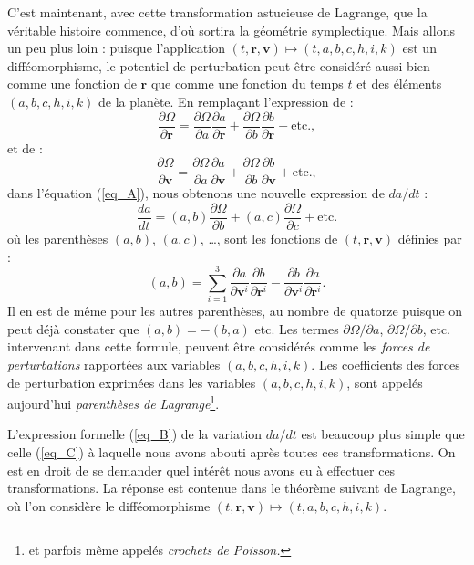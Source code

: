 \documentclass[12pt,paperletter, reqno]{amsart}
\newcommand{\rr}{\mathbf{r}}
\newcommand{\vv}{\mathbf{v}}
\theoremstyle{plain}
\theoremstyle{remark}
\begin{document}
  C'est maintenant,
  avec cette transformation astucieuse de Lagrange,
  que la véritable histoire commence,
  d'où sortira la géométrie symplectique.
  Mais allons un peu plus loin :
  puisque l'application $(t,\rr,\vv)\mapsto (t,a,b,c,h,i,k)$ est un difféomorphisme,
  le potentiel de perturbation peut être considéré aussi bien comme une fonction de $\rr$ que comme une fonction du temps $t$ et des éléments $(a,b,c,h,i,k)$ de la planète.
  En remplaçant l'expression de :
  \begin{equation}
    \frac{\partial \Omega}{\partial \rr} = \frac{\partial \Omega}{\partial a}\frac{\partial a}{\partial \rr} + \frac{\partial \Omega}{\partial b}\frac{\partial b}{\partial \rr} + \mbox{etc.},
  \end{equation}
  et de :
  \begin{equation}
    \frac{\partial \Omega}{\partial \vv} = \frac{\partial \Omega}{\partial a}\frac{\partial a}{\partial \vv} + \frac{\partial \Omega}{\partial b}\frac{\partial b}{\partial \vv} + \mbox{etc.},
  \end{equation}
  dans l'équation (\ref{eq_A}),
  nous obtenons une nouvelle expression de $da/dt$ :
  \begin{equation}\label{eq_C}
    \frac{da}{dt} = (a,b)\frac{\partial \Omega}{\partial b} + (a,c)\frac{\partial \Omega}{\partial c} + \mbox{etc.}
  \end{equation}
  où les parenthèses $(a,b)$, $(a,c)$, \ldots, sont les fonctions de $(t,\rr,\vv)$ définies par :
  \begin{equation}
    (a,b) = \sum_{i=1}^3 \frac{\partial a}{\partial \vv^i}\frac{\partial b}{\partial \rr^i} -  \frac{\partial b}{\partial \vv^i}\frac{\partial a}{\partial \rr^i}.
  \end{equation}
  Il en est de même pour les autres parenthèses,
  au nombre de quatorze puisque on peut déjà constater que $(a,b)=-(b,a)$ etc.
  Les termes $\partial \Omega /\partial a$, $\partial \Omega /\partial b$, etc. intervenant dans cette formule,
  peuvent être considérés comme les \emph{forces de perturbations} rapportées aux variables $(a,b,c,h,i,k)$.
  Les coefficients des forces de perturbation exprimées dans les variables $(a,b,c,h,i,k)$,
  sont appelés aujourd'hui \emph{parenthèses de Lagrange}\footnote{et parfois même appelés \emph{crochets de Poisson.}}.
  
  L'expression formelle (\ref{eq_B}) de la variation $da/dt$ est beaucoup plus simple que celle (\ref{eq_C}) à laquelle nous avons abouti après toutes ces transformations.
  On est en droit de se demander quel intérêt nous avons eu à effectuer ces transformations.
  La réponse est contenue dans le théorème suivant de Lagrange,
  où l'on considère le difféomorphisme $(t,\rr,\vv)\mapsto (t,a,b,c,h,i,k)$.
  
\end{document}
